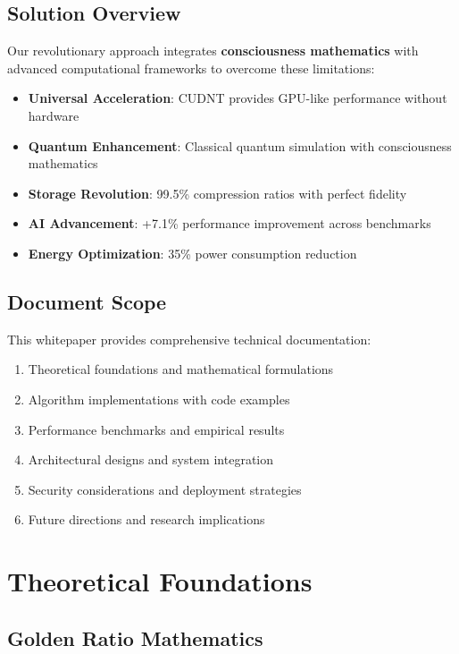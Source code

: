 \documentclass[11pt,a4paper]{article}
\begin{document}
\subsection{Solution Overview}

Our revolutionary approach integrates \textbf{consciousness mathematics} with advanced computational frameworks to overcome these limitations:

\begin{itemize}
\item \textbf{Universal Acceleration}: CUDNT provides GPU-like performance without hardware
\item \textbf{Quantum Enhancement}: Classical quantum simulation with consciousness mathematics
\item \textbf{Storage Revolution}: 99.5\% compression ratios with perfect fidelity
\item \textbf{AI Advancement}: +7.1\% performance improvement across benchmarks
\item \textbf{Energy Optimization}: 35\% power consumption reduction
\end{itemize}

\subsection{Document Scope}

This whitepaper provides comprehensive technical documentation:

\begin{enumerate}
\item Theoretical foundations and mathematical formulations
\item Algorithm implementations with code examples
\item Performance benchmarks and empirical results
\item Architectural designs and system integration
\item Security considerations and deployment strategies
\item Future directions and research implications
\end{enumerate}

\section{Theoretical Foundations}

\subsection{Golden Ratio Mathematics}
\end{document}
